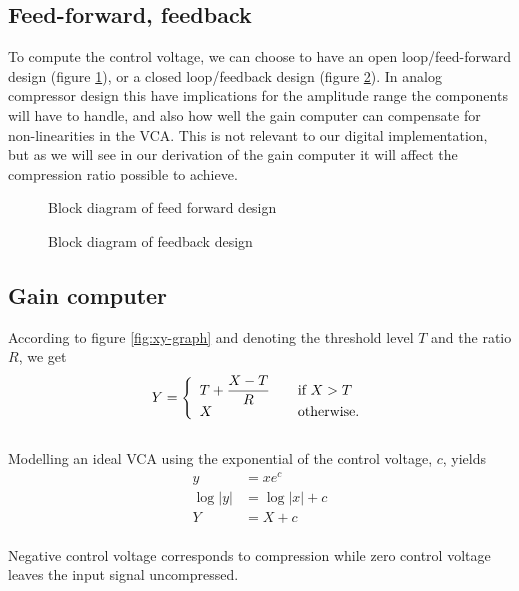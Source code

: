 \documentclass[]{article}
\begin{document}
\subsection{Feed-forward, feedback}
To compute the control voltage, we can choose to have an open loop/feed-forward design (figure \ref{fig:feedforward-blockdiagram}), or a closed loop/feedback design (figure \ref{fig:feedback-blockdiagram}). In analog compressor design this have implications for the amplitude range the components will have to handle, and also how well the gain computer can compensate for non-linearities in the VCA. This is not relevant to our digital implementation, but as we will see in our derivation of the gain computer it will affect the compression ratio possible to achieve.

\begin{figure}[ht]
\centering

\caption{Block diagram of feed forward design}
\label{fig:feedforward-blockdiagram}
\end{figure}

\begin{figure}[ht]
\centering

\caption{Block diagram of feedback design} 
\label{fig:feedback-blockdiagram}
\end{figure}

\subsection{Gain computer}
According to figure \ref{fig:xy-graph} and denoting the threshold level $T$ and the ratio $R$, we get
\begin{equation} \label{eq:gaincomp}
Y = \left\{ 
  \begin{array}{l l}
    T+ \dfrac{X-T}{R} & \quad \text{if $X > T$}\\
    X & \quad \text{otherwise.}
  \end{array} \right.
\end{equation}
\\Modelling an ideal VCA using the exponential of the control voltage, $c$, yields
\begin{align}
y &= xe^{c}   \\
\log|y| & = \log|x| + c   \\
Y &= X + c \label{eq:cv}
\end{align}
\\Negative control voltage corresponds to compression while zero control voltage leaves the input signal uncompressed. 
\end{document}

